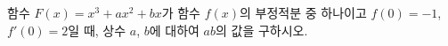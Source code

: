 함수 $F(x)=x^3+ax^2+bx$가 함수 $f(x)$의 부정적분 중 하나이고 $f(0)=-1$, $f'(0)=2$일 때, 상수 $a$, $b$에 대하여 $ab$의 값을 구하시오.
